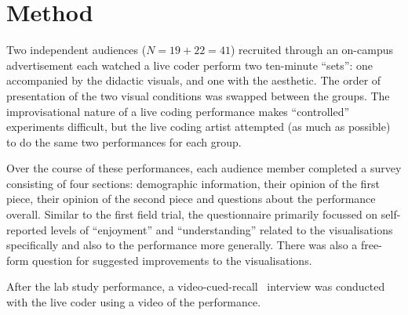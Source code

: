 \section{Method}

Two independent audiences ($N=19+22=41$) recruited through an on-campus advertisement each watched a live coder perform two ten-minute ``sets'': one accompanied by the didactic visuals, and one with the aesthetic. The order of presentation of the two visual conditions was swapped between the groups. The improvisational nature of a live coding performance makes ``controlled'' experiments difficult, but the live coding artist attempted (as much as possible) to do the same two performances for each group.

Over the course of these performances, each audience member completed
a survey consisting of four sections: demographic information, their
opinion of the first piece, their opinion of the second piece and
questions about the performance overall. Similar to the first field
trial, the questionnaire primarily focussed on self-reported levels of
``enjoyment'' and ``understanding'' related to the visualisations
specifically and also to the performance more generally. There was
also a free-form question for suggested improvements to the
visualisations.

After the lab study performance, a
video-cued-recall~\cite{Suchman1992} interview was conducted with
the live coder using a video of the performance.



